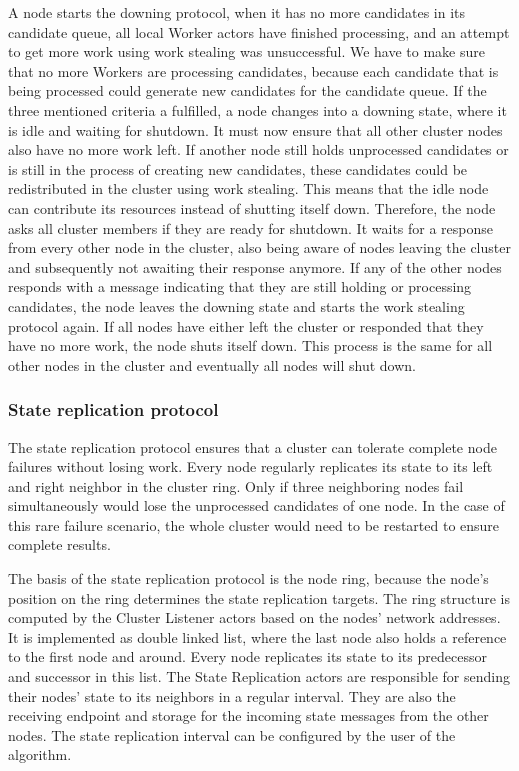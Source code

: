   A node starts the downing protocol, when it has no more candidates in its candidate queue, all local Worker actors have finished processing, and an attempt to get more work using work stealing was unsuccessful.
  We have to make sure that no more Workers are processing candidates, because each candidate that is being processed could generate new candidates for the candidate queue.
  If the three mentioned criteria a fulfilled, a \dodo{} node changes into a downing state, where it is idle and waiting for shutdown.
  It must now ensure that all other cluster nodes also have no more work left.
  If another node still holds unprocessed candidates or is still in the process of creating new candidates, these candidates could be redistributed in the cluster using work stealing.
  This means that the idle node can contribute its resources instead of shutting itself down.
  Therefore, the node asks all cluster members if they are ready for shutdown.
  It waits for a response from every other node in the cluster, also being aware of nodes leaving the cluster and subsequently not awaiting their response anymore.
  If any of the other nodes responds with a message indicating that they are still holding or processing candidates, the node leaves the downing state and starts the work stealing protocol again.
  If all nodes have either left the cluster or responded that they have no more work, the node shuts itself down.
  This process is the same for all other nodes in the cluster and eventually all nodes will shut down.

\subsubsection{State replication protocol}\label{protocol:stateReplication}
  The state replication protocol ensures that a \dodo{} cluster can tolerate complete node failures without losing work.
  Every node regularly replicates its state to its left and right neighbor in the cluster ring.
  Only if three neighboring nodes fail simultaneously would \dodo{} lose the unprocessed candidates of one node.
  In the case of this rare failure scenario, the whole \dodo{} cluster would need to be restarted to ensure complete results.

  The basis of the state replication protocol is the node ring, because the node's position on the ring determines the state replication targets.
  The ring structure is computed by the Cluster Listener actors based on the nodes' network addresses.
  It is implemented as double linked list, where the last node also holds a reference to the first node and around.
  Every node replicates its state to its predecessor and successor in this list.
  The State Replication actors are responsible for sending their nodes' state to its neighbors in a regular interval.
  They are also the receiving endpoint and storage for the incoming state messages from the other nodes.
  The state replication interval can be configured by the user of the \dodo{} algorithm.

